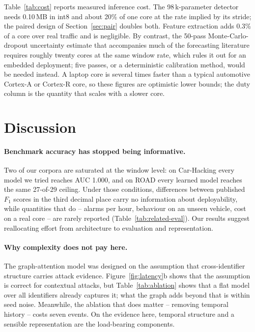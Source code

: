 \documentclass[preprint,11pt,authoryear]{elsarticle}
\begin{document}
Table~\ref{tab:cost} reports measured inference cost. The 98\,k-parameter detector needs 0.10\,MB in
int8 and about 20\% of one core at the rate implied by its stride; the paired design of
Section~\ref{sec:pair} doubles both. Feature extraction adds 0.3\% of a core over real traffic and is
negligible. By contrast, the 50-pass Monte-Carlo-dropout uncertainty estimate that accompanies much
of the forecasting literature \citep{gal2016dropout} requires roughly twenty cores at the same window
rate, which rules it out for an embedded deployment; five passes, or a deterministic calibration
method, would be needed instead. A laptop core is several times faster than a typical automotive
Cortex-A or Cortex-R core, so these figures are optimistic lower bounds; the duty column is the
quantity that scales with a slower core.

\section{Discussion}
\label{sec:discussion}

\paragraph{Benchmark accuracy has stopped being informative.} Two of our corpora are saturated at the
window level: on Car-Hacking every model we tried reaches AUC 1.000, and on ROAD every learned model
reaches the same 27-of-29 ceiling. Under those conditions, differences between published $F_1$
scores in the third decimal place carry no information about deployability, while quantities that do
-- alarms per hour, behaviour on an unseen vehicle, cost on a real core -- are rarely reported
(Table~\ref{tab:related-eval}). Our results suggest reallocating effort from architecture to
evaluation and representation.

\paragraph{Why complexity does not pay here.} The graph-attention model was designed on the
assumption that cross-identifier structure carries attack evidence. Figure~\ref{fig:latency}b shows
that the assumption is correct for contextual attacks, but Table~\ref{tab:ablation} shows that a flat
model over all identifiers already captures it; what the graph adds beyond that is within seed noise.
Meanwhile, the ablation that does matter -- removing temporal history -- costs seven events. On the
evidence here, temporal structure and a sensible representation are the load-bearing components.
\end{document}
